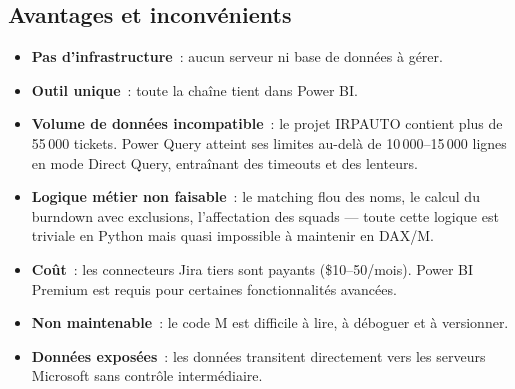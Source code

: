 \documentclass[12pt, a4paper]{article}
\begin{document}
\vspace{0.2cm}

\begin{center}
\end{center}

\vspace{0.2cm}

\subsection{Avantages et inconvénients}

\begin{orangebox}
\begin{itemize}[leftmargin=1.5em, itemsep=3pt]
  \item[\textcolor{greenborder}{+}] \textbf{Pas d'infrastructure}~: aucun serveur
        ni base de données à gérer.
  \item[\textcolor{greenborder}{+}] \textbf{Outil unique}~: toute la chaîne tient
        dans Power BI.
  \item[\textcolor{redborder}{--}] \textbf{Volume de données incompatible}~: le
        projet IRPAUTO contient plus de 55\,000 tickets. Power Query atteint ses
        limites au-delà de 10\,000--15\,000 lignes en mode Direct Query, entraînant
        des timeouts et des lenteurs.
  \item[\textcolor{redborder}{--}] \textbf{Logique métier non faisable}~: le matching
        flou des noms, le calcul du burndown avec exclusions, l'affectation des squads
        — toute cette logique est triviale en Python mais quasi impossible à maintenir
        en DAX/M.
  \item[\textcolor{redborder}{--}] \textbf{Coût}~: les connecteurs Jira tiers sont
        payants (\$10--50/mois). Power BI Premium est requis pour certaines
        fonctionnalités avancées.
  \item[\textcolor{redborder}{--}] \textbf{Non maintenable}~: le code M est difficile
        à lire, à déboguer et à versionner.
  \item[\textcolor{redborder}{--}] \textbf{Données exposées}~: les données transitent
        directement vers les serveurs Microsoft sans contrôle intermédiaire.
\end{itemize}
\end{orangebox}
\end{document}
